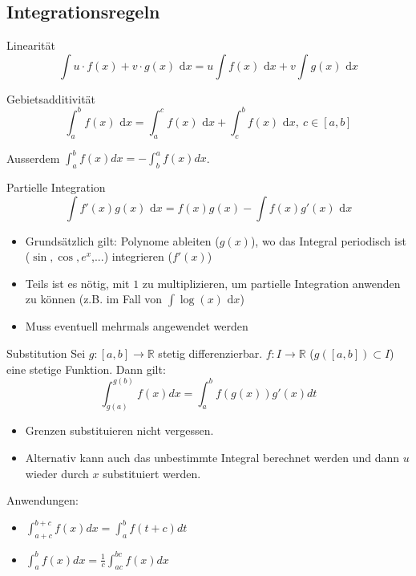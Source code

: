 \documentclass[a4paper,10pt]{article}
\def\dx{\text{ d}x}
\begin{document}
\subsection{Integrationsregeln}
\begin{subbox}{Linearität}
 \vspace{-12pt}
 $$\int u\cdot f(x) + v \cdot g(x) \dx = u \int f(x) \dx + v \int g(x) \dx$$
\end{subbox}
\begin{subbox}{Gebietsadditivität}
 \vspace{-12pt}
 $$\int_a^b f(x) \dx = \int_a^c f(x) \dx + \int_c^b f(x) \dx, \ c \in [a,b]$$
\end{subbox}

Ausserdem $\int_{a}^{b} f(x) dx = -\int_{b}^{a} f(x) dx$.

\begin{mainbox}{Partielle Integration}
 \vspace{-12pt}
 $$\int f'(x) g(x) \dx = f(x)g(x) - \int f(x) g'(x) \dx$$
\end{mainbox}

\begin{itemize}
 \item Grundsätzlich gilt: Polynome ableiten ($g(x)$), wo das Integral periodisch ist ($\sin, \cos, e^x$,...) integrieren ($f'(x)$)
 \item Teils ist es nötig, mit $1$ zu multiplizieren, um partielle Integration anwenden zu können (z.B. im Fall von $\int \log(x) \dx$)
 \item Muss eventuell mehrmals angewendet werden
\end{itemize}

\begin{mainbox}{Substitution}
  Sei $g: [a, b] \to \mathbb{R}$ stetig differenzierbar. $f: I \to \mathbb{R}$ ($g([a, b]) \subset I$) eine stetige Funktion. Dann gilt:
  $$\int_{g(a)}^{g(b)} f(x)dx = \int_{a}^{b} f(g(x))g'(x)dt$$
\end{mainbox}

\begin{itemize}
 \item Grenzen substituieren nicht vergessen.
 \item Alternativ kann auch das unbestimmte Integral berechnet werden und dann $u$ wieder durch $x$ substituiert werden.
\end{itemize}

Anwendungen:
\begin{itemize}
  \item $\int_{a+c}^{b+c} f(x)dx = \int_a^b f(t+c)dt$
  \item $\int_a^b f(x)dx = \frac{1}{c} \int_{ac}^{bc} f(x)dx$
\end{itemize}
\end{document}
